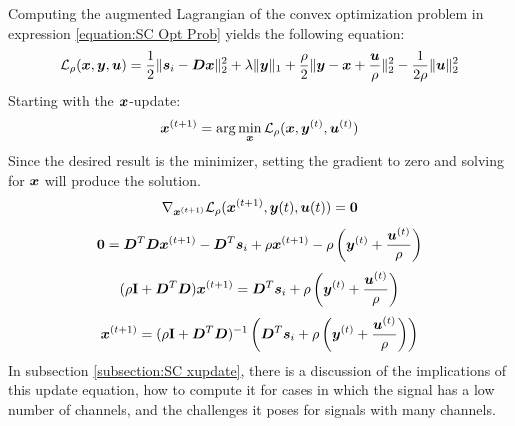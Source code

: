 Computing the augmented Lagrangian of the convex optimization problem in expression \ref{equation:SC Opt Prob} yields the following equation:
%
\begin{equation}
\mathcal{L}_{\rho}(\bm{x},\bm{y},\bm{u}) = \frac{1}{2} \|\bm{s}_i - \bm{D}\bm{x}\|_2^2 + \lambda\|\bm{y}\|_1 + \frac{\rho}{2}\|\bm{y} - \bm{x} + \frac{\bm{u}}{\rho}\|_2^2 - \frac{1}{2\rho}\|\bm{u}\|_2^2
\end{equation}
%
Starting with the $\bm{x}$-update:
\begin{equation}
\bm{x}^{(t + 1)} = \arg\min_{\bm{x}} \mathcal{L}_{\rho}(\bm{x},\bm{y}^{(t)},\bm{u}^{(t)})
\end{equation}
%
Since the desired result is the minimizer, setting the gradient to zero and solving for $\bm{x}$ will produce the solution.
%
\begin{equation}
\nabla_{\bm{x}^{(t + 1)}} \mathcal{L}_{\rho}(\bm{x}^{(t + 1)},\bm{y}{(t)},\bm{u}{(t)}) = \bm{0}
\end{equation}
%
\begin{equation}
\bm{0} = \bm{D}^T\bm{D}\bm{x}^{(t + 1)} - \bm{D}^T\bm{s}_i + \rho\bm{x}^{(t + 1)} - \rho\left(\bm{y}^{(t)} + \frac{\bm{u}^{(t)}}{\rho}\right)
\end{equation}
%
\begin{equation}
(\rho{\bf I} + \bm{D}^T\bm{D})\bm{x}^{(t + 1)} = \bm{D}^T\bm{s}_i + \rho\left(\bm{y}^{(t)} + \frac{\bm{u}^{(t)}}{\rho}\right)
\end{equation}
%
\begin{equation}
\bm{x}^{(t + 1)} = (\rho{\bf I} + \bm{D}^T\bm{D})^{-1}\left(\bm{D}^T\bm{s}_i + \rho\left(\bm{y}^{(t)} + \frac{\bm{u}^{(t)}}{\rho}\right)\right)
\end{equation}
%
In subsection \ref{subsection:SC xupdate}, there is a discussion of the implications of this update equation, how to compute it for cases in which the signal has a low number of channels, and the challenges it poses for signals with many channels.


